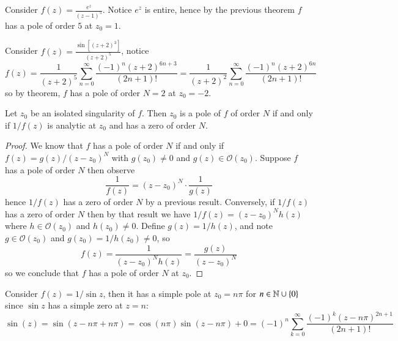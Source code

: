 \begin{example}
    Consider $f(z) = \frac{e^z}{(z-1)^5}$. Notice $e^z$ is entire, hence by the previous theorem $f$ has a pole of order $5$ at $z_0 = 1$.
\end{example}

\begin{example}
    Consider $f(z) = \frac{\sin[(z+2)^3]}{(z+2)^5}$, notice \begin{equation*}
        f(z) = \frac{1}{(z+2)^5}\sum_{n=0}^{\infty}\frac{(-1)^n(z+2)^{6n+3}}{(2n+1)!} = \frac{1}{(z+2)^2}\sum_{n=0}^{\infty}\frac{(-1)^n(z+2)^{6n}}{(2n+1)!}
    \end{equation*}
    so by theorem, $f$ has a pole of order $N  =2$ at $z_0 = -2$.
\end{example}

\begin{theorem}
    Let $z_0$ be an isolated singularity of $f$. Then $z_0$ is a pole of $f$ of order $N$ if and only if $1/f(z)$ is analytic at $z_0$ and has a zero of order $N$.
\end{theorem}
\begin{proof}
    We know that $f$ has a pole of order $N$ if and only if $f(z) = g(z)/(z-z_0)^N$ with $g(z_0) \neq 0$ and $g(z) \in \mathcal{O}(z_0)$. Suppose $f$ has a pole of order $N$ then observe \begin{equation*}
        \frac{1}{f(z)} = (z-z_0)^N\cdot\frac{1}{g(z)}
    \end{equation*}
    hence $1/f(z)$ has a zero of order $N$ by a previous result. Conversely, if $1/f(z)$ has a zero of order $N$ then by that result we have $1/f(z) = (z-z_0)^Nh(z)$ where $h \in \mathcal{O}(z_0)$ and $h(z_0) \neq 0$. Define $g(z) = 1/h(z)$, and note $g \in \mathcal{O}(z_0)$ and $g(z_0) = 1/h(z_0) \neq 0$, so \begin{equation*}
        f(z) = \frac{1}{(z-z_0)^Nh(z)} = \frac{g(z)}{(z-z_0)^N}
    \end{equation*}
    so we conclude that $f$ has a pole of order $N$ at $z_0$.
\end{proof}

\begin{example}
    Consider $f(z) = 1/\sin z$, then it has a simple pole at $z_0 = n\pi$ for $n \in \mathbb N\cup \{0\}$ since $\sin z$ has a simple zero at $z = n$: \begin{equation*}
        \sin(z) = \sin(z-n\pi+n\pi) = \cos(n\pi)\sin(z-n\pi)+0=(-1)^n\sum_{k=0}^{\infty}\frac{(-1)^k(z-n\pi)^{2n+1}}{(2n+1)!}
    \end{equation*}
\end{example}

